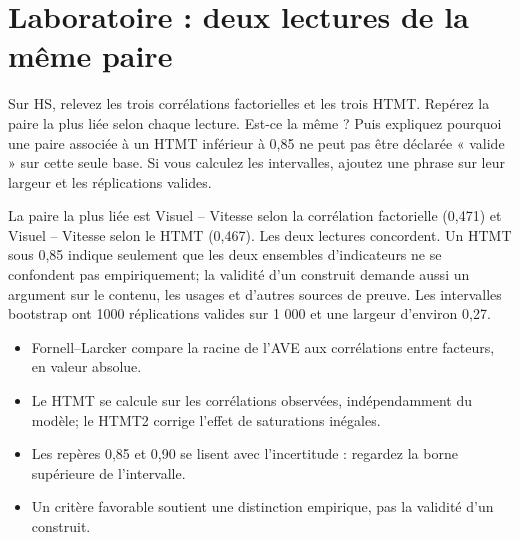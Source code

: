 \documentclass[
  french,
  11pt,
  a4paper,
  DIV=11,
  numbers=noendperiod]{scrreprt}
\providecommand{\tightlist}{%
  \setlength{\itemsep}{0pt}\setlength{\parskip}{0pt}}
\begin{document}
\section{Laboratoire : deux lectures de la même
paire}\label{laboratoire-deux-lectures-de-la-muxeame-paire}

Sur HS, relevez les trois corrélations factorielles et les trois HTMT.
Repérez la paire la plus liée selon chaque lecture. Est-ce la même ?
Puis expliquez pourquoi une paire associée à un HTMT inférieur à 0,85 ne
peut pas être déclarée « valide » sur cette seule base. Si vous calculez
les intervalles, ajoutez une phrase sur leur largeur et les réplications
valides.

\begin{tcolorbox}[enhanced jigsaw, arc=.35mm, bottomrule=.15mm, bottomtitle=1mm, breakable, colback=white, colbacktitle=quarto-callout-tip-color!10!white, colframe=quarto-callout-tip-color-frame, coltitle=black, left=2mm, leftrule=.75mm, opacityback=0, opacitybacktitle=0.6, rightrule=.15mm, title={Réponse}, titlerule=0mm, toprule=.15mm, toptitle=1mm]

La paire la plus liée est Visuel -- Vitesse selon la corrélation
factorielle (0,471) et Visuel -- Vitesse selon le HTMT (0,467). Les deux
lectures concordent. Un HTMT sous 0,85 indique seulement que les deux
ensembles d'indicateurs ne se confondent pas empiriquement; la validité
d'un construit demande aussi un argument sur le contenu, les usages et
d'autres sources de preuve. Les intervalles bootstrap ont 1000
réplications valides sur 1 000 et une largeur d'environ 0,27.

\end{tcolorbox}

\begin{tcolorbox}[enhanced jigsaw, arc=.35mm, bottomrule=.15mm, bottomtitle=1mm, breakable, colback=white, colbacktitle=quarto-callout-important-color!10!white, colframe=quarto-callout-important-color-frame, coltitle=black, left=2mm, leftrule=.75mm, opacityback=0, opacitybacktitle=0.6, rightrule=.15mm, title={À retenir}, titlerule=0mm, toprule=.15mm, toptitle=1mm]

\begin{itemize}
\tightlist
\item
  Fornell--Larcker compare la racine de l'AVE aux corrélations entre
  facteurs, en valeur absolue.
\item
  Le HTMT se calcule sur les corrélations observées, indépendamment du
  modèle; le HTMT2 corrige l'effet de saturations inégales.
\item
  Les repères 0,85 et 0,90 se lisent avec l'incertitude : regardez la
  borne supérieure de l'intervalle.
\item
  Un critère favorable soutient une distinction empirique, pas la
  validité d'un construit.
\end{itemize}

\end{tcolorbox}
\end{document}
